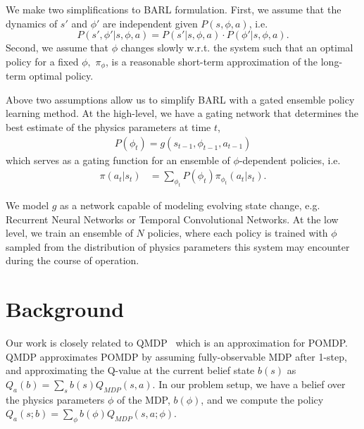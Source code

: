 \documentclass{article}
\begin{document}
We make two simplifications to BARL formulation. First, we assume that the dynamics of $s'$ and $\phi'$ are independent given $P(s, \phi, a)$, i.e.
\begin{equation*}
P(s',\phi'|s, \phi, a) = P(s'|s, \phi, a)\cdot P(\phi'|s, \phi, a).
\end{equation*}
Second, we assume that $\phi$ changes slowly w.r.t. the system such that an optimal policy for a fixed $\phi,$
$\pi_{\phi}$, is a reasonable short-term approximation of the long-term optimal policy.

Above two assumptions allow us to simplify BARL with a gated ensemble policy learning method. At the high-level, we have a gating network that determines the best estimate of the physics parameters at time $t$,
\begin{align*}
P(\phi_t) = g(s_{t-1}, \phi_{t-1}, a_{t-1})
\end{align*}
which serves as a gating function for an ensemble of $\phi$-dependent policies, i.e.
\begin{align*}
\pi(a_t | s_t) &= \sum_{\phi_t} P(\phi_t) \pi_{\phi_t}(a_t | s_t).
\end{align*}

We model $g$ as a network capable of modeling evolving state change, e.g. Recurrent Neural Networks or Temporal Convolutional Networks. At the low level, we train an ensemble of $N$ policies, where each policy is trained with $\phi$ sampled from the distribution of physics parameters this system may encounter during the course of operation.

\section{Background}
Our work is closely related to QMDP~\cite{littman1995learning, karkus2017qmdp} which is an approximation for POMDP. QMDP approximates POMDP by assuming fully-observable MDP after 1-step, and approximating the Q-value at the current belief state $b(s)$ as $Q_a(b) =\sum_s b(s)Q_{MDP}(s, a)$. In our problem setup, we have a belief over the physics parameters $\phi$ of the MDP, $b(\phi)$, and we compute the policy $Q_a(s;b) = \sum_\phi b(\phi)Q_{MDP}(s,a;\phi)$.



\end{document}
